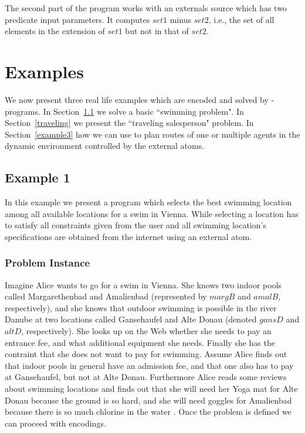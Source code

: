 \documentclass[a4paper, titlepage]{article}
\begin{document}
The second part of the program works with an externals source 
which has two predicate input parameters. It computes $\mathit{set1}$ minus $\mathit{set2}$, i.e., the set of all elements in the extension of $\mathit{set1}$ but not in that of $\mathit{set2}$. 

\section{Examples}
\label{sec:examples}
We now present three real life examples  
which are encoded and solved by \hex-programs. In Section~\ref{example1} we solve a basic ``swimming 
problem". In Section~\ref{traveling} we present the ``traveling salesperson" problem. In Section~\ref{example3} how we can use \dlvhex{} to plan routes of one or multiple agents in the dynamic 
environment controlled by the external atoms.

\subsection{Example 1}
\label{example1}
In this example we present a program which selects  
the best swimming location among all available locations 
for a swim in Vienna. While selecting a location has to 
satisfy all constraints given from the user and all swimming location's specifications are obtained from the internet using  
an external atom.
 
\subsubsection{Problem Instance}
Imagine Alice wants to go for a swim in Vienna. She knows 
two indoor pools called Margarethenbad and Amalienbad 
(represented by $\mathit{margB}$ and $\mathit{amalB}$, 
respectively), and she knows that outdoor swimming is 
possible in the river Danube at two locations called 
Gansehaufel and Alte Donau (denoted $\mathit{gansD}$ and 
$\mathit{altD}$, respectively). She looks up on the Web 
whether she needs to pay an entrance fee, and what 
additional equipment she needs. Finally she has the 
contraint that she does not want to pay for swimming. 
Assume Alice finds out that indoor pools in general have an 
admission fee, and that one also
has to pay at Gansehaufel, but not at Alte Donau. 
Furthermore Alice reads some reviews about swimming 
locations and finds out that she will need her Yoga mat for 
Alte Donau because the ground is so hard, and she will need 
goggles for Amalienbad because there is so much chlorine in 
the water \cite{efikrs2015}. Once the problem is defined we can 
proceed with encodings.    
\end{document}
